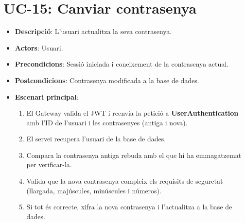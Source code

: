 \section{UC-15: Canviar contrasenya}
\begin{itemize}
    \item \textbf{Descripció}: L'usuari actualitza la seva contrasenya.
    \item \textbf{Actors}: Usuari.
    \item \textbf{Precondicions}: Sessió iniciada i coneixement de la contrasenya actual.
    \item \textbf{Postcondicions}: Contrasenya modificada a la base de dades.
    \item \textbf{Escenari principal}:
    \begin{enumerate}
        \item El Gateway valida el JWT i reenvia la petició a \textbf{UserAuthentication} amb l'ID de l'usuari i les contrasenyes (antiga i nova).
        \item El servei recupera l'usuari de la base de dades.
        \item Compara la contrasenya antiga rebuda amb el que hi ha emmagatzemat per verificar-la.
        \item Valida que la nova contrasenya compleix els requisits de seguretat (llargada, majúscules, minúscules i números).
        \item Si tot és correcte, xifra la nova contrasenya i l'actualitza a la base de dades.
    \end{enumerate}
\end{itemize}

